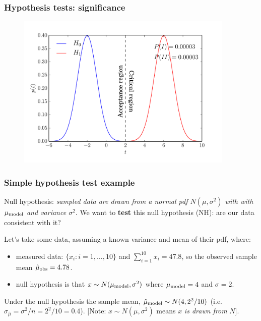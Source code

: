 \begin{frame}

\frametitle{Hypothesis tests: significance}
\label{hypothesistests:significance}


\begin{figure}[htbp]
\centering
\includegraphics[keepaspectratio,width=\textwidth,height=210pt]{figures/hypothesis_test_2.pdf}
\label{hypothesis_test_2}
\end{figure}

\end{frame}

\begin{frame}

\frametitle{Simple hypothesis test example}
\label{simplehypothesistestexample}

Null hypothesis: \emph{sampled data are drawn from a normal pdf $N(\mu, \sigma^2)$ with with $\mu_{\rm model}$
and variance $\sigma^2$}. We want to \textbf{test} this null hypothesis (NH): are our data consistent with it?

Let's take some data, assuming a known variance and mean of their pdf, where:

\begin{itemize}
\item measured data: $\{x_i: i=1,\ldots,10\}$ and $\sum_{i=1}^{10}x_i = 47.8$, so the observed sample mean
$\hat{\mu}_{\rm obs} = 4.78$.

\item null hypothesis is that $x\sim N(\mu_{\rm model}, \sigma^2)$ where $\mu_{\rm model} =4$ and $\sigma=2$.

\end{itemize}

Under the null hypothesis the sample mean, $\hat{\mu}_{\rm model} \sim N(4, 2^2/10)$
(i.e. $\sigma_{\hat{\mu}} = \sigma^2/n = 2^2/10 = 0.4$). [Note: $x \sim N(\mu, \sigma^2)$
means $x$ \emph{is drawn from} $N$].

\end{frame}


